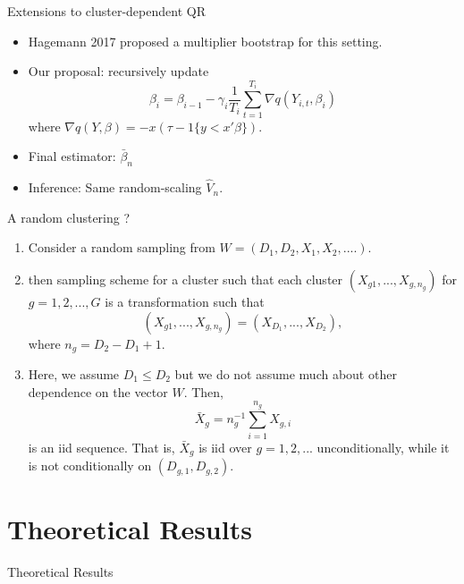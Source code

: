 \documentclass[beamer, t]{beamer}
\begin{document}
\begin{frame}{Extensions to cluster-dependent QR}
	
	
	\begin{itemize}
		\item Hagemann 2017  proposed a multiplier bootstrap for this setting. 
		
		\item Our proposal: recursively update
		$$
		\beta_i = \beta_{i-1} -\gamma_i \frac{1}{T_i}\sum_{t=1}^{T_i}\nabla q(Y_{i,t}, \beta_i)
		$$
		where $\nabla q(Y, \beta) = -x(\tau -1\{y<x'\beta\})$.
		
		\item Final estimator: $\bar\beta_n$
		
		\item Inference:  Same random-scaling $\widehat V_n$.
	\end{itemize}
	
\end{frame}

\begin{frame}{A random clustering ? }
	
	\begin{enumerate}
		\item 	Consider a random sampling from $W=\left(D_{1},D_{2},X_{1},X_{2},....\right)$. 
		
		\item then sampling scheme for a cluster such that  each cluster $\left(X_{g1},...,X_{g,n_{g}}\right)$
		for $g=1,2,...,G$ is a transformation such that 
		\[
		\left(X_{g1},...,X_{g,n_{g}}\right)=\left(X_{D_{1}},...,X_{D_{2}}\right),
		\]
		where $ n_g =D_2 - D_1 +1 $.
		\item
		Here, we assume $D_{1}\leq D_{2}$ but we do not  assume much
		about other dependence on the vector $W$. Then, 
		\[
		\bar{X}_{g}=n_{g}^{-1}\sum_{i=1}^{n_{g}}X_{g,i}
		\]
		is an iid sequence. That is, $\bar{X}_{g}$ is iid over $g=1,2,...$
		unconditionally, while it is not conditionally on $\left(D_{g,1},D_{g,2}\right)$. 
	\end{enumerate}

\end{frame}


\section{Theoretical Results}

\begin{frame}
    \vfill
    \centering
    \LARGE{Theoretical Results}
    \vfill
\end{frame}
\end{document}
